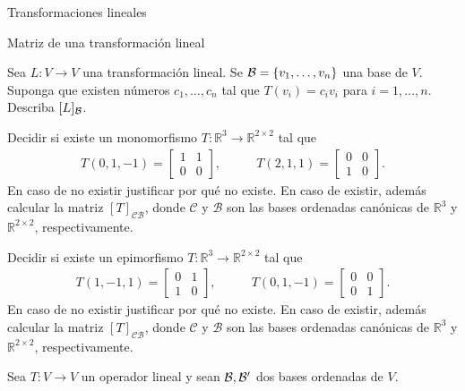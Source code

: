 \begin{chapter}{Transformaciones lineales}
\begin{section}{Matriz de una transformaci\'on lineal}
\begin{enumex}
\begin{enumex}
            \end{enumex}
            \item  Sea $L: V \to V$ una transformación lineal. Se  $\mathcal{B} =\{v_1,\ldots,v_n\}$ una base de $V$. Suponga que existen números $c_1,\ldots,c_n$ tal que $T(v_i) = c_iv_i$ para $i=1,\ldots,n$. Describa $[L]_{\mathcal{B}}$.
            \item  Decidir si existe un monomorfismo $T:\mathbb{R}^3\longrightarrow\mathbb{R}^{2\times 2}$ tal que
            \begin{align*}
            T(0,1,-1) = \begin{bmatrix}
                            1 & 1 \\
                            0 & 0
                        \end{bmatrix},\qquad
            & T(2,1,1) = \begin{bmatrix}
                            0 & 0 \\
                            1 & 0
                        \end{bmatrix}.
            \end{align*}
            En caso de no existir justificar por qué no existe. En caso de existir, además calcular la matriz $[T]_{\mathcal{C}\mathcal{B}}$, donde $\mathcal{C}$ y $\mathcal{B}$ son las bases ordenadas canónicas de $\mathbb{R}^3$ y
            $\mathbb{R}^{2\times 2}$, respectivamente.
            \item  Decidir si existe un epimorfismo  $T:\mathbb{R}^3\longrightarrow\mathbb{R}^{2\times 2}$ tal que
            \begin{align*}
            T(1,-1,1) = \begin{bmatrix}
                            0 & 1 \\
                            1 & 0
                        \end{bmatrix},\qquad
            & T(0,1,-1) = \begin{bmatrix}
                            0 & 0 \\
                            0 & 1
                            \end{bmatrix}.
            \end{align*}
            En caso de no existir justificar por qué no existe. En caso de existir, además calcular la matriz $[T]_{\mathcal{C}\mathcal{B}}$, donde $\mathcal{C}$ y $\mathcal{B}$ son las bases ordenadas canónicas de $\mathbb{R}^3$ y
            $\mathbb{R}^{2\times 2}$, respectivamente.
            \item Sea $T: V \to V$ un operador lineal y sean $\mathcal{B}, \mathcal{B}'$ dos bases ordenadas de $V$. 

\end{enumex}
\end{section}
\end{chapter}
